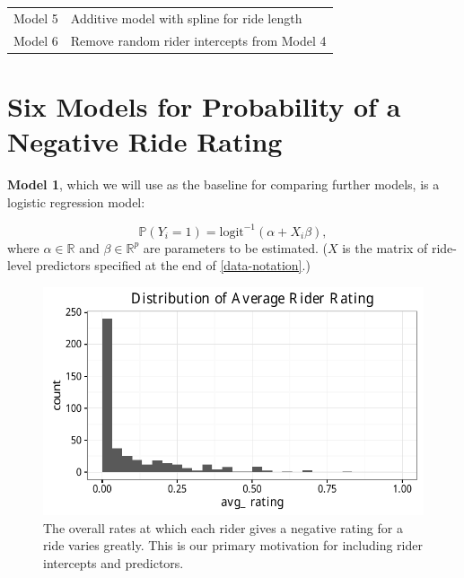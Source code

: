 \documentclass[12pt,twoside]{reedthesis}
\begin{document}
\begin{longtable}[]{@{}ll@{}}
\begin{minipage}[t]{0.13\columnwidth}
  Model 5
  \strut\end{minipage} &
  \begin{minipage}[t]{0.72\columnwidth}\raggedright\strut
  Additive model with spline for ride length
  \strut\end{minipage}\tabularnewline
  \begin{minipage}[t]{0.13\columnwidth}\raggedright\strut
  Model 6
  \strut\end{minipage} &
  \begin{minipage}[t]{0.72\columnwidth}\raggedright\strut
  Remove random rider intercepts from Model 4
  \strut\end{minipage}\tabularnewline
  \bottomrule
  \end{longtable}
  
  \section{Six Models for Probability of a Negative Ride
  Rating}\label{ride-models}
  
  \textbf{Model 1}, which we will use as the baseline for comparing
  further models, is a logistic regression model:
  
  \[ \mathbb{P} (Y_i=1) = \text{logit}^{-1} (\alpha + X_i \beta),\] where
  \(\alpha \in \mathbb{R}\) and \(\beta \in \mathbb{R}^p\) are parameters
  to be estimated. (\(X\) is the matrix of ride-level predictors specified
  at the end of \autoref{data-notation}.)
  
  \begin{figure}[tbh]
  \centering
  \includegraphics[angle = 0,scale = 1]{figure/rider_avgs.pdf}
  \caption[Distribution of Average Rider Rating]{\normalsize{The overall rates at which each rider gives a negative rating for a
  ride varies greatly. This is our primary motivation for including rider intercepts
  and predictors.}}
  \label{fig:rider-avgs}
  \end{figure}
  
\end{document}
